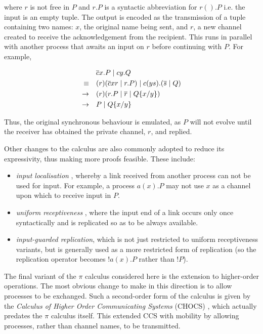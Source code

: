 \noindent where $r$ is not free in $P$ and $r.P$ is a syntactic
abbreviation for $r().P$ i.e. the input is an empty tuple.  The output
is encoded as the transmission of a tuple containing two names: $x$,
the original name being sent, and $r$, a new channel created to
receive the acknowledgement from the recipient.  This runs in parallel
with another process that awaits an input on $r$ before continuing
with $P$.  For example,

\begin{equation}
\begin{aligned}
& \overline{c}x.P \;|\; cy.Q \\
\equiv \quad & (r)(\overline{c}xr\;|\;r.P) \;|\; c(ys).(\overline{s}\;|\;Q) \\
\stackrel{}{\rightarrow} \quad & (r) (r.P \;|\; \overline{r} \;|\; Q\{x/y\}) \\
\stackrel{}{\rightarrow} \quad & P \;|\; Q\{x/y\}
\end{aligned}
\end{equation}

\noindent Thus, the original synchronous behaviour is emulated, as $P$
will not evolve until the receiver has obtained the private channel,
$r$, and replied.

Other changes to the calculus are also commonly adopted to reduce its
expressivity, thus making more proofs feasible.  These include:

\begin{itemize}
\item \emph{input localisation} \cite{merro:locality}, whereby a link
  received from another process can not be used for input.  For
  example, a process $a(x).P$ may not use $x$ as a channel upon which
  to receive input in $P$.
\item \emph{uniform receptiveness}
  \cite{sangiorgi:uniformreceptiveness}, where the input end of a link
  occurs only once syntactically and is replicated so as to be always
  available.
\item \emph{input-guarded replication}, which is not just restricted
  to uniform receptiveness variants, but is generally used as a more
  restricted form of replication (so the replication operator becomes
  $!a(x).P$ rather than $!P$).
\end{itemize}

The final variant of the $\pi$ calculus considered here is the
extension to higher-order operations.  The most obvious change to make
in this direction is to allow processes to be exchanged.  Such a
second-order form of the calculus is given by the \emph{Calculus of
  Higher Order Communicating Systems} (CHOCS) \cite{thomsen:chocs},
which actually predates the $\pi$ calculus itself.  This extended CCS
with mobility by allowing processes, rather than channel names, to be
transmitted.

